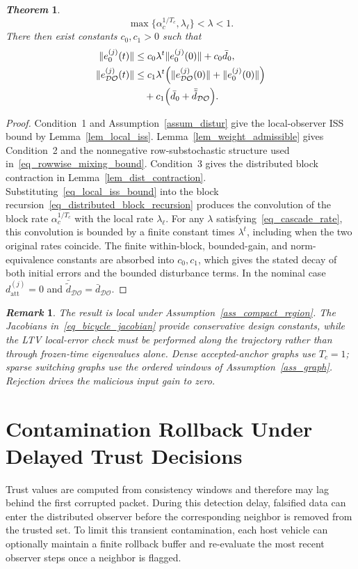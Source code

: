 \documentclass[letterpaper,journal]{IEEEtran}
\def\DO{\mathcal{DO}} %
\newtheorem{theorem}{\it Theorem}%
\newtheorem{remark}{\it Remark}%
\begin{document}
\begin{theorem}
\begin{equation}
\max\{\alpha_c^{1/T_c},\lambda_{\ell}\}<\lambda<1.
\label{eq_cascade_rate}
\end{equation}
There then exist constants $c_0,c_1>0$ such that
\begin{align}
\|e_0^{(j)}(t)\| &\le c_0\lambda^t \|e_0^{(j)}(0)\| + c_0 \bar{d}_0,\\
\|e_{\DO}^{(j)}(t)\| &\le c_1\lambda^t
\Big(\|e_{\DO}^{(j)}(0)\|+\|e_0^{(j)}(0)\|\Big)\notag\\
&\quad+c_1\Big(\bar d_0+\bar{\tilde d}_{\DO}\Big).
\end{align}

\end{theorem}
\begin{proof}
Condition~1 and Assumption~\ref{assum_distur} give the local-observer ISS bound by Lemma~\ref{lem_local_iss}. Lemma~\ref{lem_weight_admissible} gives Condition~2 and the nonnegative row-substochastic structure used in~\eqref{eq_rowwise_mixing_bound}. Condition~3 gives the distributed block contraction in Lemma~\ref{lem_dist_contraction}. Substituting~\eqref{eq_local_iss_bound} into the block recursion~\eqref{eq_distributed_block_recursion} produces the convolution of the block rate $\alpha_c^{1/T_c}$ with the local rate $\lambda_{\ell}$. For any $\lambda$ satisfying~\eqref{eq_cascade_rate}, this convolution is bounded by a finite constant times $\lambda^t$, including when the two original rates coincide. The finite within-block, bounded-gain, and norm-equivalence constants are absorbed into $c_0,c_1$, which gives the stated decay of both initial errors and the bounded disturbance terms. In the nominal case $d_{\mathrm{att}}^{(j)}=0$ and $\bar{\tilde d}_{\DO}=\bar d_{\DO}$.
\end{proof}

\begin{remark}
The result is local under Assumption~\ref{ass_compact_region}. The Jacobians in~\eqref{eq_bicycle_jacobian} provide conservative design constants, while the LTV local-error check must be performed along the trajectory rather than through frozen-time eigenvalues alone. Dense accepted-anchor graphs use $T_c=1$; sparse switching graphs use the ordered windows of Assumption~\ref{ass_graph}. Rejection drives the malicious input gain to zero.
\end{remark}

\section{Contamination Rollback Under Delayed Trust Decisions}\label{sec_rollback}
Trust values are computed from consistency windows and therefore may lag behind the first corrupted packet. During this detection delay, falsified data can enter the distributed observer before the corresponding neighbor is removed from the trusted set. To limit this transient contamination, each host vehicle can optionally maintain a finite rollback buffer and re-evaluate the most recent observer steps once a neighbor is flagged.
\end{document}
